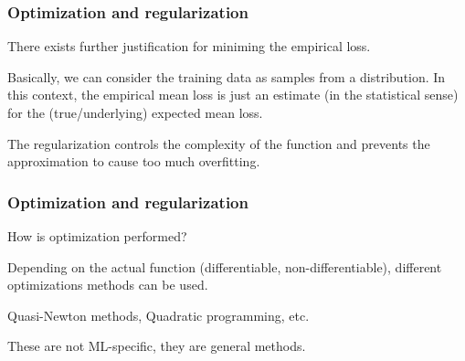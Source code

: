 \documentclass[usenames,dvipsnames]{beamer}
\begin{document}


 


\begin{frame}\frametitle{Optimization and regularization}
There exists further justification for miniming the empirical loss.

\vspace{0.4cm}
Basically, we can consider the training data as samples from a
distribution.  In this context, the empirical mean loss is just an
estimate (in the statistical sense) for the (true/underlying) expected mean loss.

\vspace{0.4cm}
The regularization controls the complexity of the function and
prevents the approximation to cause too much overfitting.
\end{frame}

\begin{frame}\frametitle{Optimization and regularization}
How is optimization performed?

\vspace{0.4cm}
Depending on the actual function (differentiable, non-differentiable), different optimizations methods can be used.

\vspace{0.4cm}
Quasi-Newton methods, Quadratic programming, etc.

\vspace{0.4cm}
These are not ML-specific, they are general methods.
\end{frame}
\end{document}
